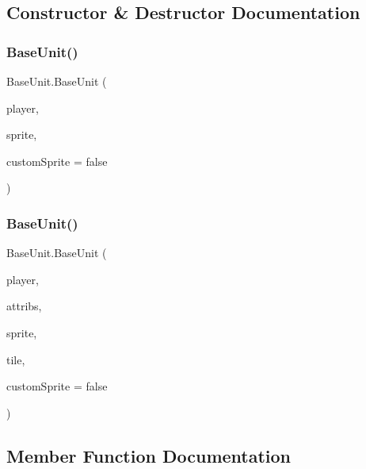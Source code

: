 \subsection{Constructor \& Destructor Documentation}
\mbox{\label{class_base_unit_a039c2e87402c3edaa8637e3be14b34b8}} 
\subsubsection{\texorpdfstring{BaseUnit()}{BaseUnit()}\hspace{0.1cm}{\footnotesize\ttfamily [1/2]}}
{\footnotesize\ttfamily Base\+Unit.\+Base\+Unit (\begin{DoxyParamCaption}\item[{bool}]{player,  }\item[{\mbox{\hyperlink{class_base_unit_a086712791ce1a3cb5dc6448d8bbc1f62}{Sprite\+Preset}}}]{sprite,  }\item[{bool}]{custom\+Sprite = {\ttfamily false} }\end{DoxyParamCaption})}

\mbox{\label{class_base_unit_a2c6cc9c0c1a13df230bb2a3b3622448b}} 
\subsubsection{\texorpdfstring{BaseUnit()}{BaseUnit()}\hspace{0.1cm}{\footnotesize\ttfamily [2/2]}}
{\footnotesize\ttfamily Base\+Unit.\+Base\+Unit (\begin{DoxyParamCaption}\item[{bool}]{player,  }\item[{\mbox{\hyperlink{class_attributes_a2dcc4757e5dd7b7d518f43f4f194d175}{Attributes.\+Preset}}}]{attribs,  }\item[{\mbox{\hyperlink{class_base_unit_a086712791ce1a3cb5dc6448d8bbc1f62}{Sprite\+Preset}}}]{sprite,  }\item[{\mbox{\hyperlink{class_tile}{Tile}}}]{tile,  }\item[{bool}]{custom\+Sprite = {\ttfamily false} }\end{DoxyParamCaption})}



\subsection{Member Function Documentation}
\mbox{\label{class_base_unit_a01c63c5cd0d41b5ca787470fd0c19472}} 
